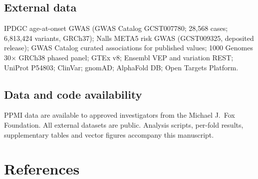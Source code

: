 \documentclass[10pt]{article}
\begin{document}
\subsection*{External data}

IPDGC age-at-onset GWAS (GWAS Catalog GCST007780; 28,568 cases; 6,813,424 variants, GRCh37); Nalls
META5 risk GWAS (GCST009325, deposited release); GWAS Catalog curated associations for published
values; 1000 Genomes 30$\times$ GRCh38 phased panel; GTEx v8; Ensembl VEP and variation REST;
UniProt P54803; ClinVar; gnomAD; AlphaFold DB; Open Targets Platform.

\subsection*{Data and code availability}

PPMI data are available to approved investigators from the Michael J.\ Fox Foundation. All
external datasets are public. Analysis scripts, per-fold results, supplementary tables and vector
figures accompany this manuscript.


\section*{References}
\end{document}
